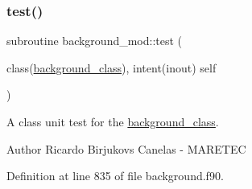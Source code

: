 \subsubsection{\texorpdfstring{test()}{test()}}
{\footnotesize\ttfamily subroutine background\+\_\+mod\+::test (\begin{DoxyParamCaption}\item[{class(\mbox{\hyperlink{structbackground__mod_1_1background__class}{background\+\_\+class}}), intent(inout)}]{self }\end{DoxyParamCaption})\hspace{0.3cm}{\ttfamily [private]}}



A class \textquotesingle{}unit\textquotesingle{} test for the \mbox{\hyperlink{structbackground__mod_1_1background__class}{background\+\_\+class}}. 

\begin{DoxyAuthor}{Author}
Ricardo Birjukovs Canelas -\/ M\+A\+R\+E\+T\+EC 
\end{DoxyAuthor}


Definition at line 835 of file background.\+f90.


